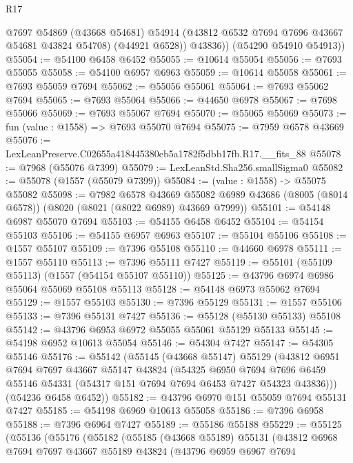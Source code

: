 \begin{lexlean}{R17}
\begin{coremodule}
            @7697
            @54869
            (@43668 @54681)
            @54914
            (@43812 @6532 @7694 @7696 @43667 @54681 @43824 @54708)
            (@44921 @6528))
          @43836))
      (@54290 @54910 @54913))
@55054 := @54100 @6458 @6452
@55055 := @10614 @55054
@55056 := @7693 @55055
@55058 := @54100 @6957 @6963
@55059 := @10614 @55058
@55061 := @7693 @55059 @7694
@55062 := @55056 @55061
@55064 := @7693 @55062 @7694
@55065 := @7693 @55064
@55066 := @44650 @6978
@55067 := @7698 @55066
@55069 := @7693 @55067 @7694
@55070 := @55065 @55069
@55073 := fun (value : @1558) => @7693 @55070 @7694
@55075 := @7959 @6578 @43669
@55076 := LexLeanPreserve.C02655a418445380eb5a1782f5dbb17fb.R17.__fits_88
@55078 := @7968 (@55076 @7399)
@55079 := LexLeanStd.Sha256.smallSigma0
@55082 := @55078 (@1557 (@55079 @7399))
@55084 := (value : @1558) -> @55075 @55082
@55098 := @7982
    @6578
    @43669
    @55082
    @6989
    @43686
    (@8005 (@8014 @6578))
    (@8020 (@8021 (@8022 @6989) @43669 @7999))
@55101 := @54148 @6987 @55070 @7694
@55103 := @54155 @6458 @6452
@55104 := @54154 @55103
@55106 := @54155 @6957 @6963
@55107 := @55104 @55106
@55108 := @1557 @55107
@55109 := @7396 @55108
@55110 := @44660 @6978
@55111 := @1557 @55110
@55113 := @7396 @55111 @7427
@55119 := @55101 (@55109 @55113) (@1557 (@54154 @55107 @55110))
@55125 := @43796 @6974 @6986 @55064 @55069 @55108 @55113
@55128 := @54148 @6973 @55062 @7694
@55129 := @1557 @55103
@55130 := @7396 @55129
@55131 := @1557 @55106
@55133 := @7396 @55131 @7427
@55136 := @55128 (@55130 @55133) @55108
@55142 := @43796 @6953 @6972 @55055 @55061 @55129 @55133
@55145 := @54198 @6952 @10613 @55054
@55146 := @54304 @7427
@55147 := @54305 @55146
@55176 := @55142
    (@55145
      (@43668 @55147)
      @55129
      (@43812
        @6951
        @7694
        @7697
        @43667
        @55147
        @43824
        (@54325
          @6950
          @7694
          @7696
          @6459
          @55146
          @54331
          (@54317 @151 @7694 @7694 @6453 @7427 @54323 @43836)))
      (@54236 @6458 @6452))
@55182 := @43796 @6970 @151 @55059 @7694 @55131 @7427
@55185 := @54198 @6969 @10613 @55058
@55186 := @7396 @6958
@55188 := @7396 @6964 @7427
@55189 := @55186 @55188
@55229 := @55125
    (@55136
      (@55176
        (@55182
          (@55185
            (@43668 @55189)
            @55131
            (@43812
              @6968
              @7694
              @7697
              @43667
              @55189
              @43824
              (@43796
                @6959
                @6967
                @7694

\end{coremodule}
\end{lexlean}
